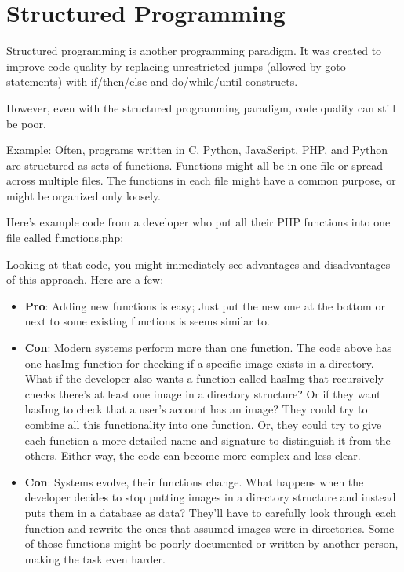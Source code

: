 \section{Structured Programming}

Structured programming is another programming paradigm. It was created to improve code quality by replacing unrestricted jumps (allowed by goto statements) with if/then/else and do/while/until constructs.

However, even with the structured programming paradigm, code quality can still be poor.

Example: Often, programs written in C, Python, JavaScript, PHP, and Python are structured as sets of functions. Functions might all be in one file or spread across multiple files. The functions in each file might have a common purpose, or might be organized only loosely.

Here's example code from a developer who put all their PHP functions into one file called functions.php:



\replaceme

Looking at that code, you might immediately see advantages and disadvantages of this approach. Here are a few:

\begin{itemize}
\item \textbf{Pro}: Adding new functions is easy; Just put the new one at the bottom or next to some existing functions is seems similar to.
\item \textbf{Con}: Modern systems perform more than one function. The code above has one hasImg function for checking if a specific image exists in a directory. What if the developer also wants a function called hasImg that recursively checks there's at least one image in a directory structure? Or if they want hasImg to check that a user's account has an image? They could try to combine all this functionality into one function. Or, they could try to give each function a more detailed name and signature to distinguish it from the others. Either way, the code can become more complex and less clear.
\item \textbf{Con}: Systems evolve, their functions change. What happens when the developer decides to stop putting images in a directory structure and instead puts them in a database as data? They'll have to carefully look through each function and rewrite the ones that assumed images were in directories. Some of those functions might be poorly documented or written by another person, making the task even harder.
\end{itemize}

